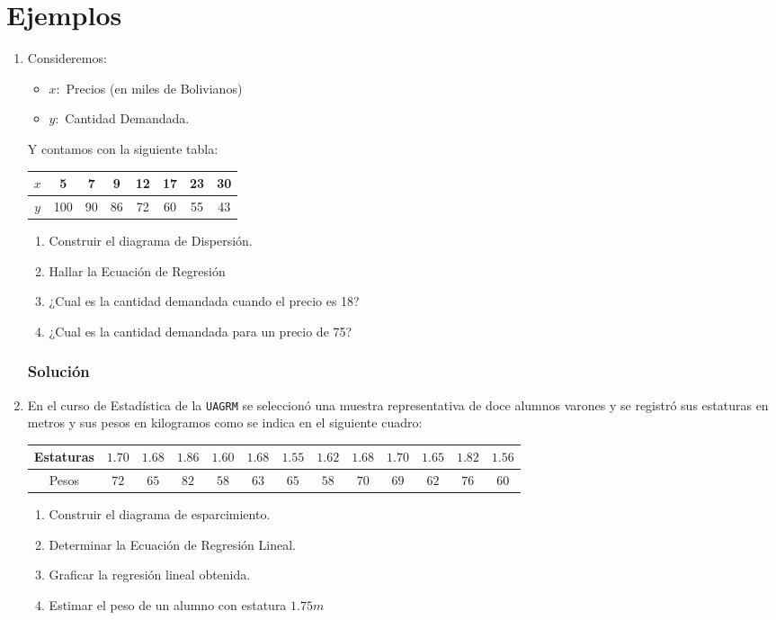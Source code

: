 \section{Ejemplos}
\begin{enumerate}
\item Consideremos:
\begin{itemize}
\item $x:$ Precios (en miles de Bolivianos)
\item $y:$ Cantidad Demandada.
\end{itemize}
Y contamos con la siguiente tabla:
\begin{center}
\begin{tabular}{|c|c|c|c|c|c|c|c|}
\hline 
$x$ & 5 & 7 & 9 & 12 & 17 & 23 & 30 \\ 
\hline 
$y$ & 100 & 90 & 86 & 72 & 60 & 55 & 43 \\ 
\hline 
\end{tabular} 
 \end{center} 
 \begin{enumerate}
 \item Construir el diagrama de Dispersión.
 \item Hallar la Ecuación de Regresión
 \item ¿Cual es la cantidad demandada cuando el precio es 18?
 \item ¿Cual es la cantidad demandada para un precio de 75?
 \end{enumerate}
\subsubsection{Solución}
\item En el curso de Estadística de la \texttt{UAGRM} se seleccionó una muestra representativa de doce alumnos varones y se registró sus estaturas en metros y sus pesos en kilogramos como se indica en el siguiente cuadro:
\begin{center}
\begin{tabular}{|c|c|c|c|c|c|c|c|c|c|c|c|c|}
\hline 
Estaturas & $1.70$ & $1.68$ & $1.86$ & $1.60$ & $1.68$ & $1.55$ & $1.62$ & $1.68$ & $1.70$ & $1.65$ & $1.82$ & $1.56$ \\ 
\hline 
Pesos & $72$ & $65$ & $82$ & $58$ & $63$ & $65$ & $58$ & $70$ & $69$ & $62$ & $76$ & $60$ \\ 
\hline 
\end{tabular} 
\end{center}
\begin{enumerate}
\item Construir el diagrama de esparcimiento.
\item Determinar la Ecuación de Regresión Lineal.
\item Graficar la regresión lineal obtenida.
\item Estimar el peso de un alumno con estatura $1.75m$
\end{enumerate}

\end{enumerate}
